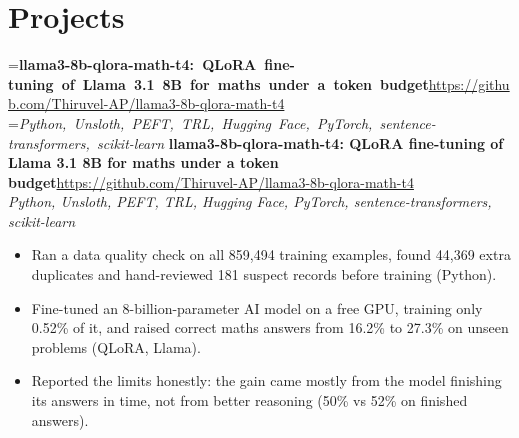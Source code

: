 \documentclass[a4paper,11pt]{article}
\newcommand{\project}[3]{%
  \textbf{#1}\hfill#3\\ {\color{muted}\small\textit{#2}}\par}
\begin{document}
\section{Projects}
=\hbox{\textbf{llama3-8b-qlora-math-t4: QLoRA fine-tuning of Llama 3.1 8B for maths under a token budget}\hspace{1em}\url{https://github.com/Thiruvel-AP/llama3-8b-qlora-math-t4}}%
=\hbox{{\small\textit{Python, Unsloth, PEFT, TRL, Hugging Face, PyTorch, sentence-transformers, scikit-learn}}}%
\ifdim\wd0>\linewidth
\ifdim\wd2>\linewidth
\textbf{llama3-8b-qlora-math-t4: QLoRA fine-tuning of Llama 3.1 8B for maths under a token budget}\\ {\color{muted}\small\textit{Python, Unsloth, PEFT, TRL, Hugging Face, PyTorch, sentence-transformers, scikit-learn}}\\ \hspace*{\fill}{\small\url{https://github.com/Thiruvel-AP/llama3-8b-qlora-math-t4}}\par
\else
\textbf{llama3-8b-qlora-math-t4: QLoRA fine-tuning of Llama 3.1 8B for maths under a token budget}\\ {\color{muted}\small\textit{Python, Unsloth, PEFT, TRL, Hugging Face, PyTorch, sentence-transformers, scikit-learn}}\hfill{\small\url{https://github.com/Thiruvel-AP/llama3-8b-qlora-math-t4}}\par
\fi
\else
\project{llama3-8b-qlora-math-t4: QLoRA fine-tuning of Llama 3.1 8B for maths under a token budget}{Python, Unsloth, PEFT, TRL, Hugging Face, PyTorch, sentence-transformers, scikit-learn}{\url{https://github.com/Thiruvel-AP/llama3-8b-qlora-math-t4}}
\fi
\begin{itemize}
  \item Ran a data quality check on all 859,494 training examples, found 44,369 extra duplicates and hand-reviewed 181 suspect records before training (Python).
  \item Fine-tuned an 8-billion-parameter AI model on a free GPU, training only 0.52\% of it, and raised correct maths answers from 16.2\% to 27.3\% on unseen problems (QLoRA, Llama).
  \item Reported the limits honestly: the gain came mostly from the model finishing its answers in time, not from better reasoning (50\% vs 52\% on finished answers).
\end{itemize}
\end{document}
